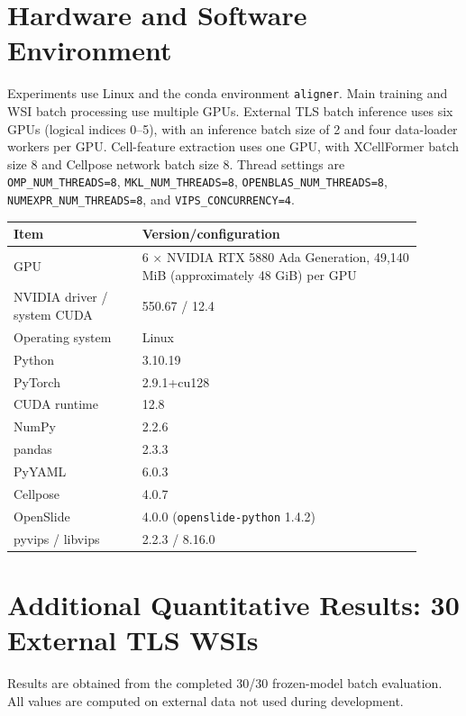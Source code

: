 \documentclass[11pt,letterpaper]{article}
\newcommand{\code}[1]{\texttt{#1}}
\begin{document}
\section{Hardware and Software Environment}
Experiments use Linux and the conda environment \code{aligner}. Main training and WSI batch processing use multiple GPUs. External TLS batch inference uses six GPUs (logical indices 0--5), with an inference batch size of 2 and four data-loader workers per GPU. Cell-feature extraction uses one GPU, with XCellFormer batch size 8 and Cellpose network batch size 8. Thread settings are \code{OMP\_NUM\_THREADS=8}, \code{MKL\_NUM\_THREADS=8}, \code{OPENBLAS\_NUM\_THREADS=8}, \code{NUMEXPR\_NUM\_THREADS=8}, and \code{VIPS\_CONCURRENCY=4}.

\begin{center}\small
\begin{tabular}{@{}p{0.29\linewidth}p{0.61\linewidth}@{}}
\toprule
Item & Version/configuration\\ \midrule
GPU & 6 $\times$ NVIDIA RTX 5880 Ada Generation, 49,140 MiB (approximately 48 GiB) per GPU\\
NVIDIA driver / system CUDA & 550.67 / 12.4\\
Operating system & Linux\\
Python & 3.10.19\\
PyTorch & 2.9.1+cu128\\
CUDA runtime & 12.8\\
NumPy & 2.2.6\\
pandas & 2.3.3\\
PyYAML & 6.0.3\\
Cellpose & 4.0.7\\
OpenSlide & 4.0.0 (\code{openslide-python} 1.4.2)\\
pyvips / libvips & 2.2.3 / 8.16.0\\
\bottomrule
\end{tabular}
\end{center}

\section{Additional Quantitative Results: 30 External TLS WSIs}
Results are obtained from the completed 30/30 frozen-model batch evaluation. All values are computed on external data not used during development.
\end{document}
